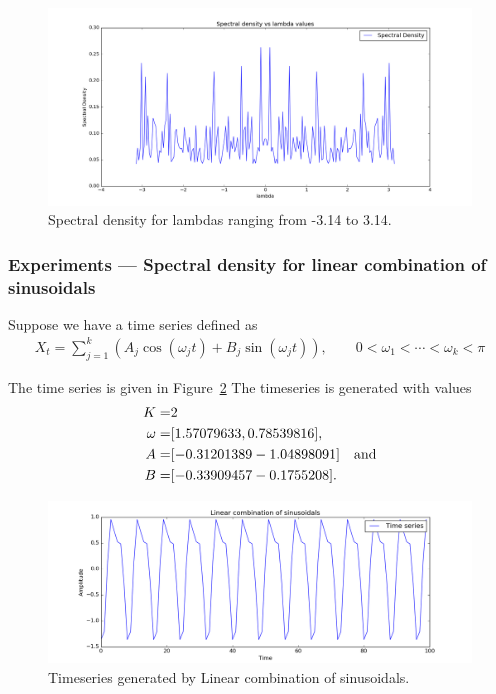 \documentclass{article}
\begin{document}
\begin{figure}[ht!]
  \centering
  \includegraphics[width=1\textwidth]{images/spectral_density/sd}
  \caption{Spectral density for lambdas ranging from -3.14 to 3.14.\label{fig:sd_sd}}
\end{figure}

\subsubsection{Experiments --- Spectral density for linear combination of sinusoidals}

Suppose we have a time series defined as 
\begin{align}
  X_{t} = \sum_{j = 1}^{k} (A_{j} \cos(\omega_{j}t) + B_{j} \sin(\omega_{j}t)), \qquad 0 < \omega_{1} < \cdots < \omega_{k} < \pi
\end{align}

The time series is given in Figure~\ref{fig:sd2_ts} The timeseries is generated with values 
\begin{align*}
  K =& 2\\ 
  \omega =& [ 1.57079633, 0.78539816],\\
  A =& [-0.31201389 -1.04898091] \text{\quad and} \\
  B =& [-0.33909457 -0.1755208 ].
\end{align*}

\begin{figure}[ht!]
  \centering
  \includegraphics[width=1\textwidth]{images/spectral_density_2/ts}
  \caption{Timeseries generated by Linear combination of sinusoidals.~\label{fig:sd2_ts}}
\end{figure}
\end{document}
